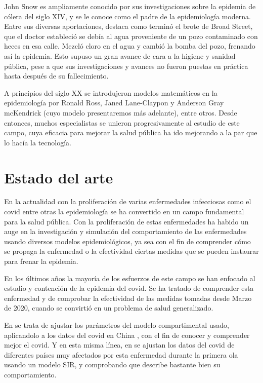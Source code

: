 John Snow es ampliamente conocido por sus investigaciones sobre la epidemia de cólera del siglo XIV, y se le conoce como el padre de la epidemiología moderna. Entre sus diversas aportaciones, destaca como terminó el brote de Broad Street, que el doctor estableció se debía al agua proveniente de un pozo contaminado con heces en esa calle. Mezcló cloro en el agua y cambió la bomba del pozo, frenando así la epidemia. Esto supuso un gran avance de cara a la higiene y sanidad pública, pese a que sus investigaciones y avances no fueron puestas en práctica hasta después de su fallecimiento.

A principios del siglo XX se introdujeron modelos matemáticos en la epidemiología por Ronald Ross, Janed Lane-Claypon y Anderson Gray mcKendrick (cuyo modelo presentaremos más adelante), entre otros. Desde entonces, muchos especialistas se unieron progresivamente al estudio de este campo, cuya eficacia para mejorar la salud pública ha ido mejorando a la par que lo hacía la tecnología.

\section{Estado del arte}

En la actualidad con la proliferación de varias enfermedades infecciosas como el covid entre otras la epidemiología se ha convertido en un campo fundamental para la salud pública. Con la proliferación de estas enfermedades ha habido un auge en la investigación y simulación del comportamiento de las  enfermedades usando diversos modelos epidemiológicos, ya sea con el fin de comprender cómo se propaga la enfermedad o la efectividad ciertas medidas que se pueden instaurar para frenar la epidemia.

En los últimos años la mayoría de los esfuerzos de este campo se han enfocado al estudio y contención de la epidemia del covid. Se ha tratado de comprender esta enfermedad y de comprobar la efectividad de las medidas tomadas desde Marzo de 2020, cuando se convirtió en un problema de salud generalizado.

En \cite{demongeotSIEpidemicModel} se trata de ajustar los parámetros del modelo compartimental usado, aplicandolo a los datos del covid en China , con el fin de conocer y comprender mejor el covid. Y en esta misma línea, en \cite{enrique_amaro} se ajustan los datos del covid de diferentes países muy afectados por esta enfermedad durante la primera ola usando un modelo SIR, y comprobando que describe bastante bien su comportamiento.

